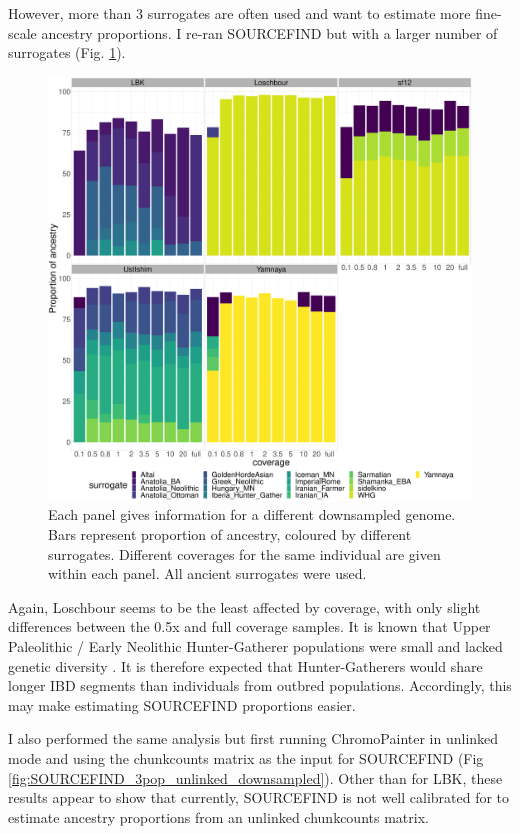 However, more than 3 surrogates are often used and want to estimate more fine-scale ancestry proportions. I re-ran SOURCEFIND but with a larger number of surrogates (Fig. \ref{fig:SOURCEFIND_AllPSop_downsampled}). 

\begin{figure}[htp]
    \centering
    \includegraphics[width=1.0\textwidth]{../images/chapter1/Allpops_SF_downsampled.pdf}
    \caption{Each panel gives information for a different downsampled genome. Bars represent proportion of ancestry, coloured by different surrogates. Different coverages for the same individual are given within each panel. All ancient surrogates were used.}
    \label{fig:SOURCEFIND_AllPSop_downsampled}
\end{figure}

Again, Loschbour seems to be the least affected by coverage, with only slight differences between the 0.5x and full coverage samples. It is known that Upper Paleolithic / Early Neolithic Hunter-Gatherer populations were small and lacked genetic diversity \cite{excoffier1999hunter, Lazaridis2014, Fu2016}. It is therefore expected that Hunter-Gatherers would share longer IBD segments than individuals from outbred populations. Accordingly, this may make estimating SOURCEFIND proportions easier.

I also performed the same analysis but first running ChromoPainter in unlinked mode and using the chunkcounts matrix as the input for SOURCEFIND (Fig \ref{fig:SOURCEFIND_3pop_unlinked_downsampled}). Other than for LBK, these results appear to show that currently, SOURCEFIND is not well calibrated for to estimate ancestry proportions from an unlinked chunkcounts matrix. 

